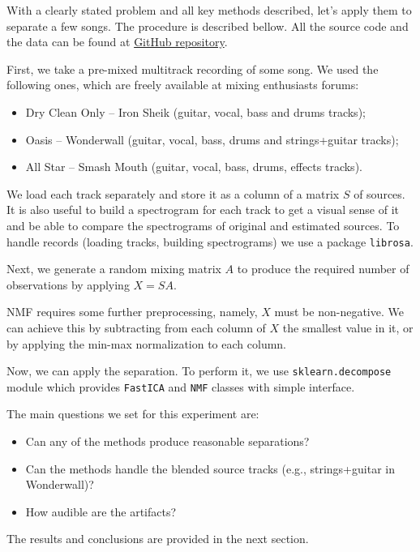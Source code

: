 \documentclass[../main.tex]{subfiles} %
\begin{document}
With a clearly stated problem and all key methods described, let's apply them to separate a few songs. The procedure is described bellow. All the source code and the data can be found at \href{https://github.com/ikachko/LA-FinalProject}{GitHub repository}.

First, we take a pre-mixed multitrack recording of some song. We used the following ones, which are freely available at mixing enthusiasts forums:

\begin{itemize}[leftmargin=4em]
	\item Dry Clean Only -- Iron Sheik (guitar, vocal, bass and drums tracks);
	\item Oasis -- Wonderwall (guitar, vocal, bass, drums and strings+guitar tracks);
	\item All Star -- Smash Mouth (guitar, vocal, bass, drums, effects tracks).
\end{itemize}

We load each track separately and store it as a column of a matrix $S$ of sources.
It is also useful to build a spectrogram for each track to get a visual sense of it and be able to compare the spectrograms of original and estimated sources. 
To handle records (loading tracks, building spectrograms) we use a package \lstinline{librosa}.

Next, we generate a random mixing matrix $A$ to produce the required number of observations by applying $X = S A$.

NMF requires some further preprocessing, namely, $X$ must be non-negative.
We can achieve this by subtracting from each column of $X$ the smallest value in it, or by applying the min-max normalization to each column. 

Now, we can apply the separation. 
To perform it, we use \lstinline{sklearn.decompose} module which provides \lstinline{FastICA} and \lstinline{NMF} classes with simple interface.

The main questions we set for this experiment are:

\begin{itemize}[leftmargin=4em]
	\item Can any of the methods produce reasonable separations?
	\item Can the methods handle the blended source tracks (e.g., strings+guitar in Wonderwall)?
	\item How audible are the artifacts?
\end{itemize}

The results and conclusions are provided in the next section.
\end{document}
